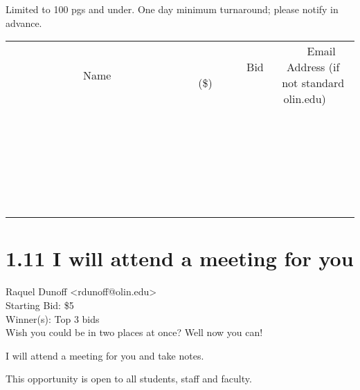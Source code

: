 \documentclass[11pt]{article}
\begin{document}
Limited to 100 pgs and under. One day minimum turnaround; please notify in advance. \\
					[6ex]
					\begin{tabular}{c c c}
						~~~~~~~~~~~~~Name~~~~~~~~~~~~~ & ~~~~~~~~~Bid (\$)~~~~~~~~~ & ~~~Email Address (if not standard olin.edu)~~~ \\
				
 & & \\
\hline
 & & \\
\hline
 & & \\
\hline
 & & \\
\hline
 & & \\
\hline
 & & \\
\hline
 & & \\
\hline
 & & \\
\hline
 & & \\
\hline
 & & \\
\hline
 & & \\
\hline
 & & \\
\hline
 & & \\
\hline
 & & \\
\hline
 & & \\
\hline
 & & \\
\hline
 & & \\
\hline
 & & \\
\hline
 & & \\
\hline
 & & \\
\hline
 & & \\
\hline
 & & \\
\hline
 & & \\
\hline
 & & \\
\hline
 & & \\
\hline
 & & \\
\hline
					\end{tabular}
					\clearpage
				
					\section*{1.11 I will attend a meeting for you}
					Raquel Dunoff <rdunoff@olin.edu> \\
					Starting Bid: \$5 \\
					Winner(s): Top 3 bids \\
					Wish you could be in two places at once? Well now you can!

I will attend a meeting for you and take notes. 

This opportunity is open to all students, staff and faculty.
\end{document}
